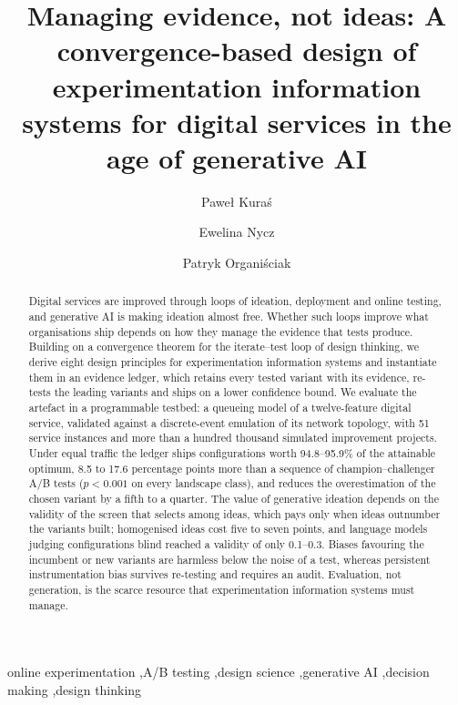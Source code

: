 \documentclass[preprint,12pt,authoryear]{elsarticle}
\newif\ifanon
\theoremstyle{definition}
\begin{document}
\begin{frontmatter}

\title{Managing evidence, not ideas: A convergence-based design of experimentation information systems for digital services in the age of generative AI}

\ifanon\else
\author[kozminski]{Pawe{\l} Kura{\'s}}
\author[prz]{Ewelina Nycz}
\author[prz]{Patryk Organi{\'s}ciak}
\fi

\begin{abstract}
Digital services are improved through loops of ideation, deployment and online testing, and generative AI is making ideation almost free. Whether such loops improve what organisations ship depends on how they manage the evidence that tests produce. Building on a convergence theorem for the iterate--test loop of design thinking, we derive eight design principles for experimentation information systems and instantiate them in an evidence ledger, which retains every tested variant with its evidence, re-tests the leading variants and ships on a lower confidence bound. We evaluate the artefact in a programmable testbed: a queueing model of a twelve-feature digital service, validated against a discrete-event emulation of its network topology, with 51 service instances and more than a hundred thousand simulated improvement projects. Under equal traffic the ledger ships configurations worth 94.8--95.9\% of the attainable optimum, 8.5 to 17.6 percentage points more than a sequence of champion--challenger A/B tests ($p<0.001$ on every landscape class), and reduces the overestimation of the chosen variant by a fifth to a quarter. The value of generative ideation depends on the validity of the screen that selects among ideas, which pays only when ideas outnumber the variants built; homogenised ideas cost five to seven points, and language models judging configurations blind reached a validity of only 0.1--0.3. Biases favouring the incumbent or new variants are harmless below the noise of a test, whereas persistent instrumentation bias survives re-testing and requires an audit. Evaluation, not generation, is the scarce resource that experimentation information systems must manage.
\end{abstract}

\begin{keyword}
online experimentation \sep A/B testing \sep design science \sep generative AI \sep decision making \sep design thinking
\end{keyword}
\end{frontmatter}
\end{document}
